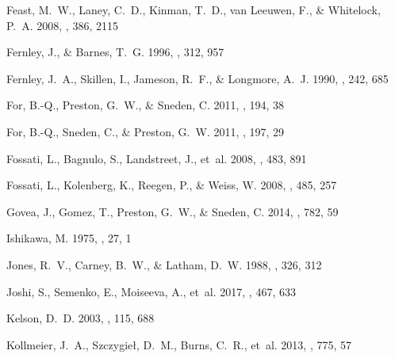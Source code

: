\documentclass[preprint]{aastex6}
\begin{document}
\begin{thebibliography}{}
{Feast}, M.~W., {Laney}, C.~D., {Kinman}, T.~D., {van Leeuwen}, F., \&
  {Whitelock}, P.~A. 2008, \mnras, 386, 2115

{Fernley}, J., \& {Barnes}, T.~G. 1996, \aap, 312, 957

{Fernley}, J.~A., {Skillen}, I., {Jameson}, R.~F., \& {Longmore}, A.~J. 1990,
  \mnras, 242, 685

{For}, B.-Q., {Preston}, G.~W., \& {Sneden}, C. 2011{}, \apjs, 194,
  38

{For}, B.-Q., {Sneden}, C., \& {Preston}, G.~W. 2011{}, \apjs, 197,
  29

{Fossati}, L., {Bagnulo}, S., {Landstreet}, J., {et~al.} 2008{},
  \aap, 483, 891

{Fossati}, L., {Kolenberg}, K., {Reegen}, P., \& {Weiss}, W.
  2008{}, \aap, 485, 257

{Govea}, J., {Gomez}, T., {Preston}, G.~W., \& {Sneden}, C. 2014, \apj, 782, 59

{Ishikawa}, M. 1975, \pasj, 27, 1

{Jones}, R.~V., {Carney}, B.~W., \& {Latham}, D.~W. 1988, \apj, 326, 312

{Joshi}, S., {Semenko}, E., {Moiseeva}, A., {et~al.} 2017, \mnras, 467, 633

{Kelson}, D.~D. 2003, \pasp, 115, 688

{Kollmeier}, J.~A., {Szczygie{\l}}, D.~M., {Burns}, C.~R., {et~al.} 2013, \apj,
  775, 57


\end{thebibliography}
\end{document}
